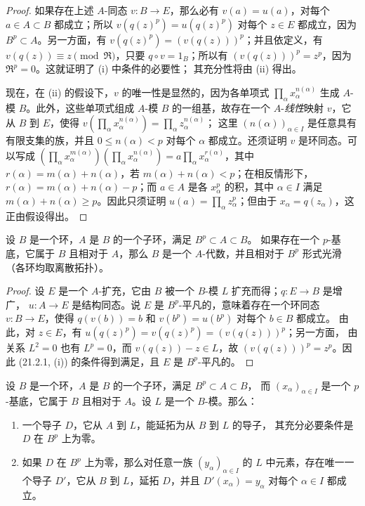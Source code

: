 \begin{proof}
如果存在上述 $A$-同态 $v:B\to E$，那么必有 $v(a)=u(a)$，对每个
$a\in A\subset B$ 都成立；所以 $v(q(z)^p)=u(q(z)^p)$ 对每个 $z\in E$
都成立，因为 $B^p\subset A$。另一方面，有
$v(q(z)^p)=(v(q(z)))^p$；并且依定义，有
$v(q(z))\equiv z\pmod{\mathfrak R}$，只要 $q\circ v=1_B$；所以有
$(v(q(z)))^p=z^p$，因为 $\mathfrak R^p=0$。这就证明了 (i) 中条件的必要性；
其充分性将由 (ii) 得出。

现在，在 (ii) 的假设下，$v$ 的唯一性是显然的，因为各单项式
$\prod_\alpha x_\alpha^{n(\alpha)}$ 生成 $A$-模 $B$。此外，这些单项式组成
$A$-模 $B$ 的一组基，故存在一个 $A$-\emph{线性}映射 $v$，它从 $B$ 到 $E$，使得
$v(\prod_\alpha x_\alpha^{n(\alpha)})=\prod_\alpha z_\alpha^{n(\alpha)}$；
这里 $(n(\alpha))_{\alpha\in I}$ 是任意具有有限支集的族，并且
$0\leq n(\alpha)<p$ 对每个 $\alpha$ 都成立。还须证明 $v$ 是环同态。可以写成
$(\prod_\alpha x_\alpha^{m(\alpha)})(\prod_\alpha x_\alpha^{n(\alpha)})
=a\prod_\alpha x_\alpha^{r(\alpha)}$，其中
$r(\alpha)=m(\alpha)+n(\alpha)$，若 $m(\alpha)+n(\alpha)<p$；在相反情形下，
$r(\alpha)=m(\alpha)+n(\alpha)-p$；而 $a\in A$
是各 $x_\alpha^p$ 的积，其中 $\alpha\in I$ 满足
$m(\alpha)+n(\alpha)\geq p$。因此只须证明 $u(a)=\prod_\alpha z_\alpha^p$；但由于
$x_\alpha=q(z_\alpha)$，这正由假设得出。
\end{proof}

\begin{corollary}[21.2.2]
\label{0.21.2.2-fr}
设 $B$ 是一个环，$A$ 是 $B$ 的一个子环，满足 $B^p\subset A\subset B$。
如果存在一个 $p$-基底，它属于 $B$ 且相对于 $A$，那么 $B$ 是一个
$A$-代数，并且相对于 $B^p$ 形式光滑（各环均取离散拓扑）。
\end{corollary}

\begin{proof}
设 $E$ 是一个 $A$-扩充，它由 $B$ 被一个 $B$-模 $L$ 扩充而得；$q:E\to B$ 是增广，
$u:A\to E$ 是结构同态。说 $E$ 是 $B^p$-平凡的，意味着存在一个环同态
$v:B\to E$，使得 $q(v(b))=b$ 和 $v(b^p)=u(b^p)$ 对每个 $b\in B$ 都成立。
由此，对 $z\in E$，有 $u(q(z)^p)=v(q(z)^p)=(v(q(z)))^p$；另一方面，
由关系 $L^2=0$ 也有 $L^p=0$，而 $v(q(z))-z\in L$，故
$(v(q(z)))^p=z^p$。因此 (21.2.1, (i)) 的条件得到满足，且 $E$ 是
$B^p$-平凡的。
\end{proof}

\begin{corollary}[21.2.3]
\label{0.21.2.3-fr}
设 $B$ 是一个环，$A$ 是 $B$ 的一个子环，满足 $B^p\subset A\subset B$，
而 $\left(x_\alpha\right)_{\alpha\in I}$ 是一个 $p$-基底，它属于 $B$
且相对于 $A$。设 $L$ 是一个 $B$-模。那么：
\begin{enumerate}
  \item[(i)] 一个导子 $D$，它从 $A$ 到 $L$，能延拓为从 $B$ 到 $L$ 的导子，
  其充分必要条件是 $D$ 在 $B^p$ 上为零。
  \item[(ii)] 如果 $D$ 在 $B^p$ 上为零，那么对任意一族
  $(y_\alpha)_{\alpha\in I}$ 的 $L$ 中元素，存在唯一一个导子 $D'$，它从
  $B$ 到 $L$，延拓 $D$，并且 $D'(x_\alpha)=y_\alpha$ 对每个
  $\alpha\in I$ 都成立。
\end{enumerate}
\end{corollary}

